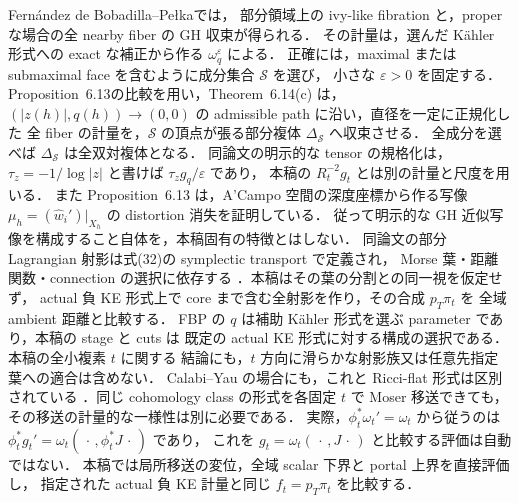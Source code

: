 Fernández de Bobadilla--Pełka\cite[Theorem 6.14(b),(c)]{FBP}では，
部分領域上の ivy-like fibration と，proper な場合の全 nearby fiber の GH 収束が得られる．
その計量は，選んだ Kähler 形式への exact な補正から作る $\omega_q^\varepsilon$ による．
正確には，maximal または submaximal face を含むように成分集合 $\mathcal S$ を選び，
小さな $\varepsilon>0$ を固定する．Proposition~6.13の比較を用い，Theorem~6.14(c) は，
$(|z(h)|,q(h))\to(0,0)$ の admissible path に沿い，直径を一定に正規化した
全 fiber の計量を，$\mathcal S$ の頂点が張る部分複体 $\Delta_{\mathcal S}$ へ収束させる．
全成分を選べば $\Delta_{\mathcal S}$ は全双対複体となる．
同論文\cite[\S6.2, Notation~6.11, Proposition~6.13]{FBP}の明示的な tensor の規格化は，
$\tau_z=-1/\log|z|$ と書けば $\tau_z g_q/\varepsilon$ であり，
本稿の $R_t^{-2}g_t$ とは別の計量と尺度を用いる．
また Proposition~6.13 は，A'Campo 空間の深度座標から作る写像
$\mu_h=(\widehat w_i')|_{X_h}$ の distortion 消失を証明している．
従って明示的な GH 近似写像を構成すること自体を，本稿固有の特徴とはしない．
同論文の部分 Lagrangian 射影は式(32)の symplectic transport で定義され，
Morse 葉・距離関数・connection の選択に依存する
\cite[Remarks~5.4, 6.5, \S8]{FBP}．本稿はその葉の分割との同一視を仮定せず，
actual 負 KE 形式上で core まで含む全射影を作り，その合成 $p_T\pi_t$ を
全域 ambient 距離と比較する．
FBP の $q$ は補助 Kähler 形式を選ぶ parameter であり，本稿の stage と cuts は
既定の actual KE 形式に対する構成の選択である．本稿の全小複素 $t$ に関する
結論にも，$t$ 方向に滑らかな射影族又は任意先指定葉への適合は含めない．
Calabi--Yau の場合にも，これと Ricci-flat 形式は区別されている
\cite[Introduction, Remark 7.4]{FBP}．同じ cohomology class の形式を各固定 $t$ で
Moser 移送できても，その移送の計量的な一様性は別に必要である．
実際，$\phi_t^*\omega_t'=\omega_t$ から従うのは
$\phi_t^*g_t'=\omega_t(\,\cdot\,,\phi_t^*J\,\cdot\,)$ であり，
これを $g_t=\omega_t(\,\cdot\,,J\,\cdot\,)$ と比較する評価は自動ではない．
本稿では局所移送の変位，全域 scalar 下界と portal 上界を直接評価し，
指定された actual 負 KE 計量と同じ $f_t=p_T\pi_t$ を比較する．

